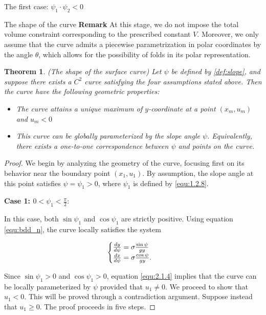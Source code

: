 \documentclass[letterpaper,reqno,10pt,twoside]{amsart}
\newtheorem{theorem}{Theorem}[section]
\theoremstyle{definition}
\theoremstyle{remark}
\begin{document}
\begin{section}{The first case: $\psi_1\cdot \psi_2<0$ }
\begin{subsection}{The shape of the curve}
    \textbf{Remark} At this stage, we do not impose the total volume constraint corresponding to the prescribed constant $V$. Moreover, we only assume that the curve admits a piecewise parametrization in polar coordinates by the angle $\theta$, which allows for the possibility of folds in its polar representation.
    
    \begin{theorem}{\label{Thm:g_1}}({The shape of the surface curve}) Let $\psi$ be defined by \eqref{def:slope}, and suppose there exists a $C^{2}$ curve satisfying the four assumptions stated above. Then the curve have the following geometric properties:
    \begin{itemize}
    \item The curve attains a unique maximum of $y$-coordinate at a point $(x_{m},u_{m})$ and $u_{m}<0$ 
    
    
    \item This curve can be globally parameterized by the slope angle $\psi$. Equivalently, there exists a one-to-one correspondence between $\psi$ and points on the curve.
    \end{itemize}
    \end{theorem}

    \begin{proof}

      We begin by analyzing the geometry of the curve, focusing first on its behavior near the boundary point $(x_{1},u_{1})$. By assumption, the slope angle at this point satisfies $\psi=\psi_{1}>0$, where $\psi_{1}$ is defined by \eqref{equ:1.2.8}.

        \textbf{Case 1: $0< \psi_{1}< \frac{\pi}{2}$}:
        
          In this case, both $\sin\psi_{1}$ and $\cos\psi_{1}$ are strictly positive. Using equation \eqref{equ:bdd_n}, the curve locally satisfies the system

        \begin{equation}{\label{equ:2.1.4}}
        \begin{cases}
            \frac{dy}{d\psi}=\sigma\frac{\sin\psi}{gy}\\
            \frac{dx}{d\psi}=\sigma\frac{\cos\psi}{gy}.
        \end{cases}
        \end{equation}

        \noindent Since $\sin\psi_{1}>0$ and $\cos\psi_{1}>0$, equation \eqref{equ:2.1.4} implies that the curve can be locally parameterized by $\psi$ provided that $u_{1}\neq 0$. We proceed to show  that $u_1<0$. This will be proved through a contradiction argument. Suppose instead that $u_1\geq 0$. The proof proceeds in five steps.


\end{proof}
\end{subsection}
\end{section}
\end{document}
